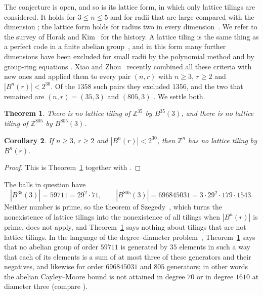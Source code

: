 \documentclass{amsart}
\newtheorem{theorem}{Theorem}[section]
\newtheorem{corollary}[theorem]{Corollary}
\theoremstyle{definition}
\theoremstyle{remark}
\numberwithin{equation}{section}
\newcommand{\Z}{\mathbb{Z}}
\begin{document}
The conjecture is open, and so is its lattice form, in which only lattice tilings are considered. It holds for $3\le n\le5$ \cite{GMP,Hor09} and for radii that are large compared with the dimension \cite{Post,HK}; the lattice form holds for radius two in every dimension~\cite{LZ}. We refer to the survey of Horak and Kim~\cite{HK} for the history. A lattice tiling is the same thing as a perfect code in a finite abelian group~\cite{HA}, and in this form many further dimensions have been excluded for small radii by the polynomial method and by group-ring equations \cite{Kim,ZG17,ZZ,Qur,ZG24}. Xiao and Zhou~\cite{XZ} recently combined all these criteria with new ones and applied them to every pair $(n,r)$ with $n\ge3$, $r\ge2$ and $|B^n(r)|<2^{30}$. Of the $1358$ such pairs they excluded $1356$, and the two that remained are $(n,r)=(35,3)$ and $(805,3)$ \cite[Theorem~5.1]{XZ}. We settle both.

\begin{theorem}\label{thm:main}
There is no lattice tiling of $\Z^{35}$ by $B^{35}(3)$, and there is no lattice tiling of $\Z^{805}$ by $B^{805}(3)$.
\end{theorem}

\begin{corollary}\label{cor:main}
If $n\ge3$, $r\ge2$ and $|B^n(r)|<2^{30}$, then $\Z^n$ has no lattice tiling by $B^n(r)$.
\end{corollary}

\begin{proof}
This is Theorem~\ref{thm:main} together with \cite[Theorem~5.1]{XZ}.
\end{proof}

The balls in question have
\[
|B^{35}(3)|=59711=29^2\cdot71,\qquad |B^{805}(3)|=696845031=3\cdot29^2\cdot179\cdot1543.
\]
Neither number is prime, so the theorem of Szegedy~\cite{Sze}, which turns the nonexistence of lattice tilings into the nonexistence of all tilings when $|B^n(r)|$ is prime, does not apply, and Theorem~\ref{thm:main} says nothing about tilings that are not lattice tilings. In the language of the degree--diameter problem~\cite{DF}, Theorem~\ref{thm:main} says that no abelian group of order $59711$ is generated by $35$ elements in such a way that each of its elements is a sum of at most three of these generators and their negatives, and likewise for order $696845031$ and $805$ generators; in other words the abelian Cayley--Moore bound is not attained in degree $70$ or in degree $1610$ at diameter three (compare \cite[Section~1]{XZ}).
\end{document}
